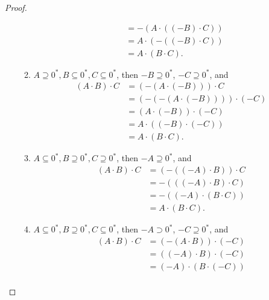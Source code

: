 \begin{proof}
\begin{enumerate}[label={(F\arabic*)}, start=5]
\begin{enumerate}[label={\textbf{Case \arabic*.}},topsep=0pt,itemsep=0pt]
\begin{align*}
                                              & = -(A\cdot ((-B)\cdot C)) \\
                                              & = A\cdot (-((-B)\cdot C)) \\
                                              & = A\cdot (B\cdot C).
                        \end{align*}
                  \item $A\supseteq {0}^{*}, B\subseteq {0}^{*}, C\subseteq {0}^{*}$, then $-B\supseteq {0}^{*}$, $-C\supseteq {0}^{*}$, and
                        \begin{align*}
                            (A\cdot B)\cdot C & = (-(A\cdot (-B)))\cdot C       \\
                                              & = (-(-(A\cdot (-B))))\cdot (-C) \\
                                              & = (A\cdot (-B))\cdot (-C)       \\
                                              & = A\cdot ((-B)\cdot (-C))       \\
                                              & = A\cdot (B\cdot C).
                        \end{align*}
                  \item $A\subseteq {0}^{*}, B\supseteq {0}^{*}, C\supseteq {0}^{*}$, then $-A\supseteq {0}^{*}$, and
                        \begin{align*}
                            (A\cdot B)\cdot C & = (-((-A)\cdot B))\cdot C \\
                                              & = -(((-A)\cdot B)\cdot C) \\
                                              & = -((-A)\cdot (B\cdot C)) \\
                                              & = A\cdot (B\cdot C).
                        \end{align*}
                  \item $A\subseteq {0}^{*}, B\supseteq {0}^{*}, C\subseteq {0}^{*}$, then $-A\supset {0}^{*}$, $-C\supseteq {0}^{*}$, and
                        \begin{align*}
                            (A\cdot B)\cdot C & = (-(A\cdot B))\cdot (-C) \\
                                              & = ((-A)\cdot B)\cdot (-C) \\
                                              & = (-A)\cdot (B\cdot (-C)) \\

\end{align*}
\end{enumerate}
\end{enumerate}
\end{proof}
